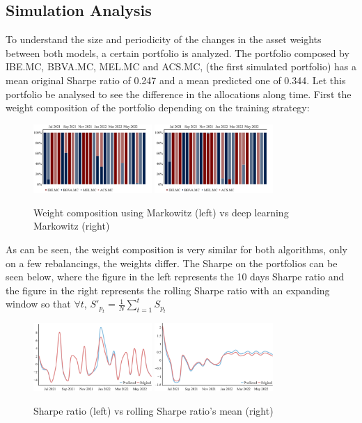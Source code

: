 \documentclass{article}
\begin{document}
\subsection{Simulation Analysis}
To understand the size and periodicity of the changes in the asset weights between both models, a certain portfolio is analyzed. The portfolio composed by IBE.MC, BBVA.MC, MEL.MC and ACS.MC, (the first simulated portfolio) has a mean original Sharpe ratio of 0.247 and a mean predicted one of 0.344. Let this portfolio be analysed to see the difference in the allocations along time.
First the weight composition of the portfolio depending on the training strategy:
\begin{figure}[H]
    \centering
{{\includegraphics[width=0.4\textwidth]{Plots/w_or.png}}}%
    \qquad
{{\includegraphics[width=0.4\textwidth]{Plots/w_pred.png}}}%
    \caption{Weight composition using Markowitz (left) vs deep learning Markowitz (right)}%
\end{figure}
As can be seen, the weight composition is very similar for both algorithms, only on a few rebalancings, the weights differ. The Sharpe on the portfolios can be seen below, where the figure in the left represents the 10 days Sharpe ratio and the figure in the right represents the rolling Sharpe ratio with an expanding window so that $\forall t$, $S'_{p_{t}} =\frac{1}{N} \sum_{t = 1}^{t}{S_{p_{t}}}$
\begin{figure}[H]
    \centering
{{\includegraphics[width=0.4\textwidth]{Plots/sh.png}}}%
    \qquad
{{\includegraphics[width=0.4\textwidth]{Plots/sh_mean.png}}}%
    \caption{Sharpe ratio (left) vs rolling Sharpe ratio's mean (right)}%
\end{figure}
\end{document}
